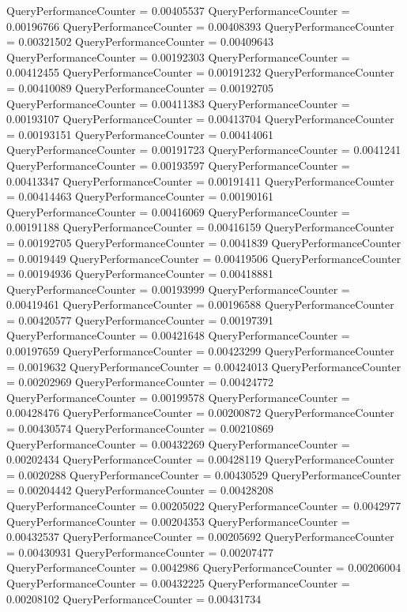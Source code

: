 \documentclass[9pt]{article}
\theoremstyle{plain}
\theoremstyle{definition}
\theoremstyle{remark}
\numberwithin{equation}{section}
\begin{document}
QueryPerformanceCounter  =  0.00405537
QueryPerformanceCounter  =  0.00196766
QueryPerformanceCounter  =  0.00408393
QueryPerformanceCounter  =  0.00321502
QueryPerformanceCounter  =  0.00409643
QueryPerformanceCounter  =  0.00192303
QueryPerformanceCounter  =  0.00412455
QueryPerformanceCounter  =  0.00191232
QueryPerformanceCounter  =  0.00410089
QueryPerformanceCounter  =  0.00192705
QueryPerformanceCounter  =  0.00411383
QueryPerformanceCounter  =  0.00193107
QueryPerformanceCounter  =  0.00413704
QueryPerformanceCounter  =  0.00193151
QueryPerformanceCounter  =  0.00414061
QueryPerformanceCounter  =  0.00191723
QueryPerformanceCounter  =  0.0041241
QueryPerformanceCounter  =  0.00193597
QueryPerformanceCounter  =  0.00413347
QueryPerformanceCounter  =  0.00191411
QueryPerformanceCounter  =  0.00414463
QueryPerformanceCounter  =  0.00190161
QueryPerformanceCounter  =  0.00416069
QueryPerformanceCounter  =  0.00191188
QueryPerformanceCounter  =  0.00416159
QueryPerformanceCounter  =  0.00192705
QueryPerformanceCounter  =  0.0041839
QueryPerformanceCounter  =  0.0019449
QueryPerformanceCounter  =  0.00419506
QueryPerformanceCounter  =  0.00194936
QueryPerformanceCounter  =  0.00418881
QueryPerformanceCounter  =  0.00193999
QueryPerformanceCounter  =  0.00419461
QueryPerformanceCounter  =  0.00196588
QueryPerformanceCounter  =  0.00420577
QueryPerformanceCounter  =  0.00197391
QueryPerformanceCounter  =  0.00421648
QueryPerformanceCounter  =  0.00197659
QueryPerformanceCounter  =  0.00423299
QueryPerformanceCounter  =  0.0019632
QueryPerformanceCounter  =  0.00424013
QueryPerformanceCounter  =  0.00202969
QueryPerformanceCounter  =  0.00424772
QueryPerformanceCounter  =  0.00199578
QueryPerformanceCounter  =  0.00428476
QueryPerformanceCounter  =  0.00200872
QueryPerformanceCounter  =  0.00430574
QueryPerformanceCounter  =  0.00210869
QueryPerformanceCounter  =  0.00432269
QueryPerformanceCounter  =  0.00202434
QueryPerformanceCounter  =  0.00428119
QueryPerformanceCounter  =  0.0020288
QueryPerformanceCounter  =  0.00430529
QueryPerformanceCounter  =  0.00204442
QueryPerformanceCounter  =  0.00428208
QueryPerformanceCounter  =  0.00205022
QueryPerformanceCounter  =  0.0042977
QueryPerformanceCounter  =  0.00204353
QueryPerformanceCounter  =  0.00432537
QueryPerformanceCounter  =  0.00205692
QueryPerformanceCounter  =  0.00430931
QueryPerformanceCounter  =  0.00207477
QueryPerformanceCounter  =  0.0042986
QueryPerformanceCounter  =  0.00206004
QueryPerformanceCounter  =  0.00432225
QueryPerformanceCounter  =  0.00208102
QueryPerformanceCounter  =  0.00431734
\end{document}
